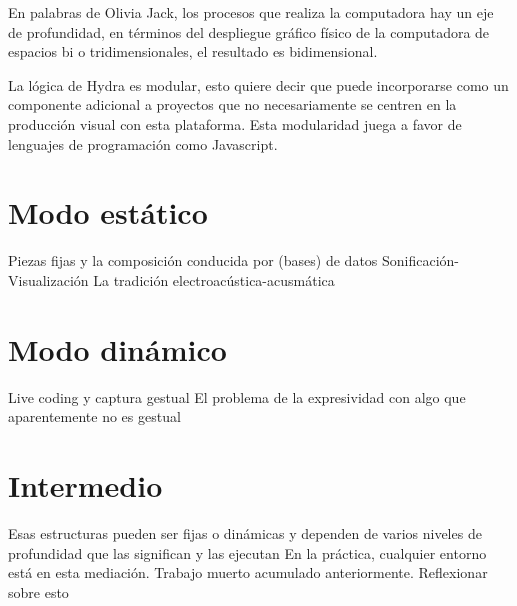 En palabras de Olivia Jack, los procesos que realiza la computadora hay un eje de profundidad, en términos del despliegue gráfico físico de la computadora de espacios bi o tridimensionales, el resultado es bidimensional.

La lógica de Hydra es modular, esto quiere decir que puede incorporarse como un componente adicional a proyectos que no necesariamente se centren en la producción visual con esta plataforma. Esta modularidad juega a favor de lenguajes de programación como Javascript. 


\section{Modo estático}

Piezas fijas y la composición conducida por (bases) de datos 
Sonificación-Visualización
La tradición electroacústica-acusmática 

\section{Modo dinámico}

Live coding y captura gestual 
El problema de la expresividad con algo que aparentemente no es gestual 

\section{Intermedio}

Esas estructuras pueden ser fijas o dinámicas y dependen de varios niveles de profundidad que las significan y las ejecutan
En la práctica, cualquier entorno está en esta mediación. Trabajo muerto acumulado anteriormente. Reflexionar sobre esto
